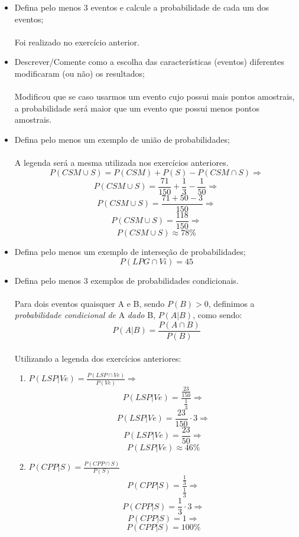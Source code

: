 \documentclass[a4paper, 12pt]{article}
\begin{document}
\begin{enumerate}
\begin{itemize}
\begin{itemize}
  \end{itemize}
  

\item Defina pelo menos 3 eventos e calcule a probabilidade de cada um dos eventos;\\\\
  Foi realizado no exercício anterior.

\item Descrever/Comente como a escolha das características (eventos) diferentes modificaram (ou não) os resultados;\\\\
  Modificou que se caso usarmos um evento cujo possui mais pontos amostrais, a probabilidade será maior que um evento que possui menos pontos amostrais.

\item Defina pelo menos um exemplo de união de probabilidades;\\\\
  A legenda será a mesma utilizada nos exercícios anteriores.\\
  $$P(CSM \cup S) = P(CSM) + P(S) - P(CSM \cap S) \Rightarrow$$
  $$P(CSM \cup S) = \frac{71}{150} + \frac{1}{3} - \frac{1}{50} \Rightarrow$$
  $$P(CSM \cup S) = \frac{71+50-3}{150} \Rightarrow$$
  $$P(CSM \cup S) = \frac{118}{150} \Rightarrow$$    
  $$P(CSM \cup S) \approx 78\% $$


\item Defina pelo menos um exemplo de interseção de probabilidades;\\
  $$P(LPG \cap Vi) = 45 $$

\item Defina pelo menos 3 exemplos de probabilidades condicionais. \\\\
  Para dois eventos quaisquer A e B, sendo $P(B)>0$, definimos a \emph{probabilidade condicional de} A \emph{dado} B, $P(A|B)$, como sendo:\\
  $$P(A|B)=\frac{P(A \cap B)}{P(B)}$$\\
  Utilizando a legenda dos exercícios anteriores:\\
  \begin{enumerate}
  \item $P(LSP|Ve)=\frac{P(LSP \cap Ve)}{P(Ve)} \Rightarrow$
    $$P(LSP|Ve)=\frac{\frac{23}{150}}{\frac{1}{3}} \Rightarrow$$
    $$P(LSP|Ve)=\frac{23}{150}\cdot3 \Rightarrow$$
    $$P(LSP|Ve)=\frac{23}{50} \Rightarrow$$
    $$P(LSP|Ve)\approx46\% $$
    
  \item $P(CPP|S)=\frac{P(CPP \cap S)}{P(S)}$
   $$P(CPP|S)=\frac{\frac{1}{3}}{\frac{1}{3}} \Rightarrow$$
   $$P(CPP|S)=\frac{1}{3}\cdot3 \Rightarrow$$
   $$P(CPP|S)=1 \Rightarrow$$
   $$P(CPP|S)=100\% $$
     

\end{enumerate}
\end{itemize}
\end{enumerate}
\end{document}
